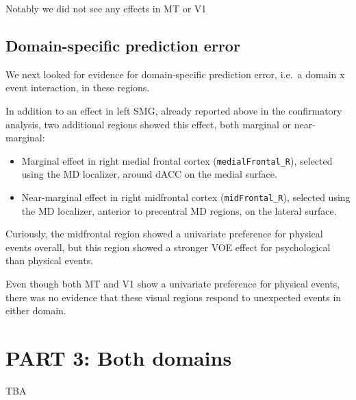 \documentclass[
]{article}
\providecommand{\tightlist}{%
  \setlength{\itemsep}{0pt}\setlength{\parskip}{0pt}}
\begin{document}
Notably we did not see any effects in MT or V1

\hypertarget{domain-specific-prediction-error-1}{%
\subsection{Domain-specific prediction
error}\label{domain-specific-prediction-error-1}}

We next looked for evidence for domain-specific prediction error, i.e.~a
domain x event interaction, in these regions.

In addition to an effect in left SMG, already reported above in the
confirmatory analysis, two additional regions showed this effect, both
marginal or near-marginal:

\begin{itemize}
\tightlist
\item
  Marginal effect in right medial frontal cortex
  (\texttt{medialFrontal\_R}), selected using the MD localizer, around
  dACC on the medial surface.
\item
  Near-marginal effect in right midfrontal cortex
  (\texttt{midFrontal\_R}), selected using the MD localizer, anterior to
  precentral MD regions, on the lateral surface.
\end{itemize}

Curiously, the midfrontal region showed a univariate preference for
physical events overall, but this region showed a stronger VOE effect
for psychological than physical events.

Even though both MT and V1 show a univariate preference for physical
events, there was no evidence that these visual regions respond to
unexpected events in either domain.

\hypertarget{part-3-both-domains}{%
\section{PART 3: Both domains}\label{part-3-both-domains}}

TBA
\end{document}
